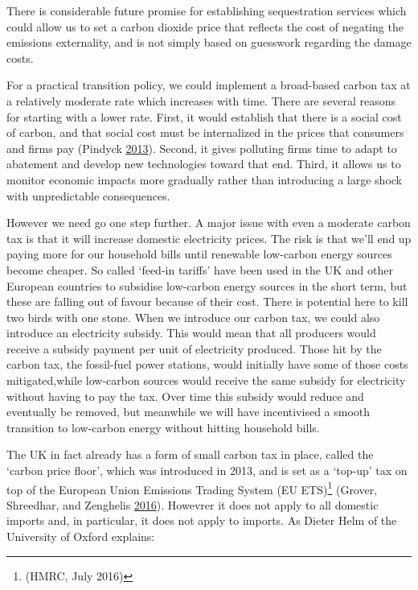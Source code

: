 \documentclass[]{tufte-handout}
\begin{document}
There is considerable future promise for establishing sequestration
services which could allow us to set a carbon dioxide price that
reflects the cost of negating the emissions externality, and is not
simply based on guesswork regarding the damage costs.

For a practical transition policy, we could implement a broad-based
carbon tax at a relatively moderate rate which increases with time.
There are several reasons for starting with a lower rate. First, it
would establish that there is a social cost of carbon, and that social
cost must be internalized in the prices that consumers and firms pay
(Pindyck \protect\hyperlink{ref-Pindyck2013}{2013}). Second, it gives
polluting firms time to adapt to abatement and develop new technologies
toward that end. Third, it allows us to monitor economic impacts more
gradually rather than introducing a large shock with unpredictable
consequences.

However we need go one step further. A major issue with even a moderate
carbon tax is that it will increase domestic electricity prices. The
risk is that we'll end up paying more for our household bills until
renewable low-carbon energy sources become cheaper. So called `feed-in
tariffs' have been used in the UK and other European countries to
subsidise low-carbon energy sources in the short term, but these are
falling out of favour because of their cost. There is potential here to
kill two birds with one stone. When we introduce our carbon tax, we
could also introduce an electricity subsidy. This would mean that all
producers would receive a subsidy payment per unit of electricity
produced. Those hit by the carbon tax, the fossil-fuel power stations,
would initially have some of those costs mitigated,while low-carbon
sources would receive the same subsidy for electricity without having to
pay the tax. Over time this subsidy would reduce and eventually be
removed, but meanwhile we will have incentivised a smooth transition to
low-carbon energy without hitting household bills.

The UK in fact already has a form of small carbon tax in place, called
the `carbon price floor', which was introduced in 2013, and is set as a
`top-up' tax on top of the European Union Emissions Trading System (EU
ETS)\footnote{(HMRC, July 2016)} (Grover, Shreedhar, and Zenghelis
\protect\hyperlink{ref-Grover2016}{2016}). Howevrer it does not apply to
all domestic imports and, in particular, it does not apply to imports.
As Dieter Helm of the University of Oxford explains:
\end{document}
